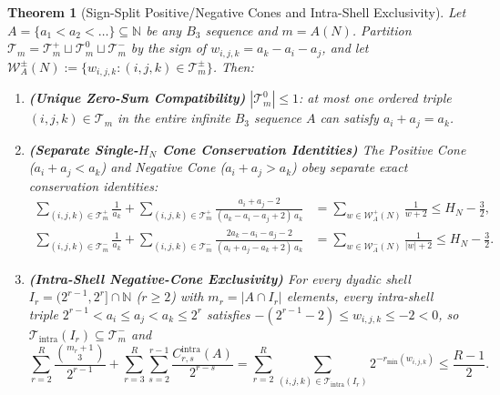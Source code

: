\documentclass[11pt,a4paper]{article}
\newtheorem{theorem}{Theorem}[section]
\theoremstyle{remark}
\begin{document}
\begin{theorem}[Sign-Split Positive/Negative Cones and Intra-Shell Exclusivity]
Let $A = \{a_1 < a_2 < \dots\} \subseteq \mathbb{N}$ be any $B_3$ sequence and $m = A(N)$. Partition $\mathcal{T}_m = \mathcal{T}_m^+ \sqcup \mathcal{T}_m^0 \sqcup \mathcal{T}_m^-$ by the sign of $w_{i,j,k} = a_k - a_i - a_j$, and let $\mathcal{W}_A^\pm(N) := \{w_{i,j,k} : (i,j,k) \in \mathcal{T}_m^\pm\}$. Then:
\begin{enumerate}
  \item \textbf{(Unique Zero-Sum Compatibility)} $|\mathcal{T}_m^0| \le 1$: at most one ordered triple $(i, j, k) \in \mathcal{T}_m$ in the entire infinite $B_3$ sequence $A$ can satisfy $a_i + a_j = a_k$.
  \item \textbf{(Separate Single-$H_N$ Cone Conservation Identities)} The Positive Cone ($a_i + a_j < a_k$) and Negative Cone ($a_i + a_j > a_k$) obey separate exact conservation identities:
  \begin{align*}
    \sum_{(i,j,k) \in \mathcal{T}_m^+} \frac{1}{a_k} + \sum_{(i,j,k) \in \mathcal{T}_m^+} \frac{a_i + a_j - 2}{(a_k - a_i - a_j + 2)\,a_k} &= \sum_{w \in \mathcal{W}_A^+(N)} \frac{1}{w + 2} \le H_N - \frac{3}{2}, \\
    \sum_{(i,j,k) \in \mathcal{T}_m^-} \frac{1}{a_k} + \sum_{(i,j,k) \in \mathcal{T}_m^-} \frac{2 a_k - a_i - a_j - 2}{(a_i + a_j - a_k + 2)\,a_k} &= \sum_{w \in \mathcal{W}_A^-(N)} \frac{1}{|w| + 2} \le H_N - \frac{3}{2}.
  \end{align*}
  \item \textbf{(Intra-Shell Negative-Cone Exclusivity)} For every dyadic shell $I_r = (2^{r-1}, 2^r] \cap \mathbb{N}$ ($r \ge 2$) with $m_r = |A \cap I_r|$ elements, every intra-shell triple $2^{r-1} < a_i \le a_j < a_k \le 2^r$ satisfies $-(2^{r-1} - 2) \le w_{i,j,k} \le -2 < 0$, so $\mathcal{T}_{\mathrm{intra}}(I_r) \subseteq \mathcal{T}_m^-$ and
  \[
    \sum_{r=2}^R \frac{\binom{m_r + 1}{3}}{2^{r-1}} + \sum_{r=3}^R \sum_{s=2}^{r-1} \frac{C_{r,s}^{\mathrm{intra}}(A)}{2^{r-s}} = \sum_{r=2}^R \sum_{(i,j,k) \in \mathcal{T}_{\mathrm{intra}}(I_r)} 2^{-r_{\min}(w_{i,j,k})} \le \frac{R - 1}{2}.
  \]
\end{enumerate}
\end{theorem}
\end{document}
